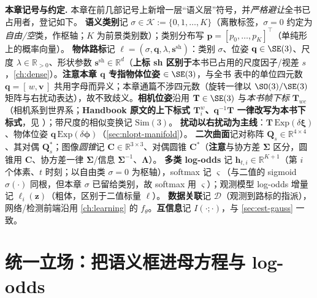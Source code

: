 \begin{note}
\textbf{本章记号与约定.}\;
本章在前几部记号上新增一层“语义层”符号，并\emph{严格避让}全书已占用者，登记如下。
\textbf{语义类别}记 $\sigma\in\mathcal{K}:=\{0,1,\dots,K\}$（离散标签，$\sigma{=}0$ 约定为\emph{自由/空}类，作枢轴；$K$ 为前景类别数）；类别分布写 $\mathbf{p}=[p_0,\dots,p_K]^\top$（单纯形上的概率向量）。
\textbf{物体路标}记 $\boldsymbol\ell=(\sigma,\mathbf{q},\lambda,\mathbf{s}^{\mathrm{sh}})$：类别 $\sigma$、位姿 $\mathbf{q}\in\SE(3)$、尺度 $\lambda\in\mathbb{R}_{>0}$、形状参数 $\mathbf{s}^{\mathrm{sh}}\in\mathbb{R}^{d}$（\textbf{上标 sh 区别于}本书已占用的尺度因子/视差 $s$，\cref{ch:dense}）。\textbf{注意本章 $\mathbf{q}$ 专指物体位姿 $\in\SE(3)$}，与全书  表中的单位四元数 $\mathbf{q}=[\,w,\mathbf{v}\,]$ 共用字母而异义；本章通篇不涉四元数（旋转一律以 $\SO(3)/\SE(3)$ 矩阵与右扰动表达），故不致歧义。\textbf{相机位姿}沿用 $\mathbf{T}\in\SE(3)$ 与\emph{本书帧下标} $\mathbf{T}_{wc}$（相机系到世界系；\textbf{Handbook 原文的上下标式 $\mathbf{T}_i^w$、$\mathbf{q}^{-1}\mathbf{T}$ 一律改写为本书下标式}，见 ）；带尺度的相似变换记 $\mathrm{Sim}(3)$。
\textbf{扰动以右扰动为主线}：$\mathbf{T}\,\mathrm{Exp}(\delta\boldsymbol\xi)$、物体位姿 $\mathbf{q}\,\mathrm{Exp}(\delta\boldsymbol\phi)$（\cref{sec:nlopt-manifold}）。
\textbf{二次曲面}记对称阵 $\mathbf{Q}_s\in\mathbb{R}^{4\times4}$、其对偶 $\mathbf{Q}_s^{*}$；图像\emph{圆锥}记 $\mathbf{C}\in\mathbb{R}^{3\times3}$、对偶圆锥 $\mathbf{C}^{*}$（\textbf{注意}与协方差 $\boldsymbol\Sigma$ 区分，圆锥用 $\mathbf{C}$、协方差一律 $\boldsymbol\Sigma$/信息 $\boldsymbol\Sigma^{-1}$、$\boldsymbol\Lambda$）。
\textbf{多类 log-odds} 记 $\mathbf{h}_{t,i}\in\mathbb{R}^{K+1}$（第 $i$ 个体素、$t$ 时刻；以自由类 $\sigma{=}0$ 为枢轴），softmax 记 $\boldsymbol\varsigma$（与二值的 sigmoid $\sigma(\cdot)$ 同根，但本章 $\sigma$ 已留给类别，故 softmax 用 $\boldsymbol\varsigma$）；观测模型 log-odds 增量记 $\boldsymbol\ell_i(\mathbf{z})$（粗体，区别于二值标量 $\ell$）。
\textbf{数据关联}记 $\mathcal{D}$（观测到路标的指派），网络/检测前端沿用 \cref{ch:learning} 的 $f_\theta$。\textbf{互信息}记 $I(\cdot;\cdot)$，与 \cref{sec:est-gauss} 一致。
\end{note}

\section{统一立场：把语义框进母方程与 log-odds}
\label{sec:semantic-frame}

